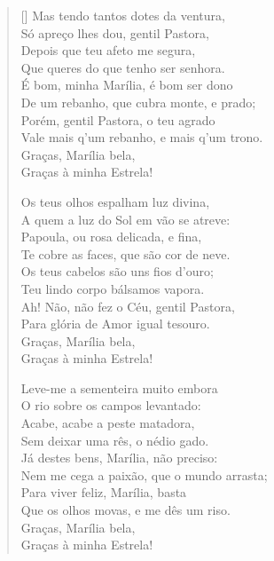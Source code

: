 \documentclass[12pt]{book}
\begin{document}
\begin{verse}[\versewidth]
					Mas tendo tantos dotes da ventura, \\
					Só apreço lhes dou, gentil Pastora, \\
					Depois que teu afeto me segura, \\
					Que queres do que tenho ser senhora. \\
					É bom, minha Marília, é bom ser dono \\
					De um rebanho, que cubra monte, e prado; \\
					Porém, gentil Pastora, o teu agrado \\
					Vale mais q’um rebanho, e mais q’um trono. \\
					\hspace{2em} Graças, Marília bela, \\
					\hspace{2em} Graças à minha Estrela!
					
					Os teus olhos espalham luz divina, \\
					A quem a luz do Sol em vão se atreve: \\
					Papoula, ou rosa delicada, e fina, \\
					Te cobre as faces, que são cor de neve. \\
					Os teus cabelos são uns fios d’ouro; \\
					Teu lindo corpo bálsamos vapora. \\
					Ah! Não, não fez o Céu, gentil Pastora, \\
					Para glória de Amor igual tesouro. \\
					\hspace{2em} Graças, Marília bela, \\
					\hspace{2em} Graças à minha Estrela!
					
					Leve-me a sementeira muito embora \\
					O rio sobre os campos levantado: \\
					Acabe, acabe a peste matadora, \\
					Sem deixar uma rês, o nédio gado. \\
					Já destes bens, Marília, não preciso: \\
					Nem me cega a paixão, que o mundo arrasta; \\
					Para viver feliz, Marília, basta \\
					Que os olhos movas, e me dês um riso. \\
					\hspace{2em} Graças, Marília bela, \\
					\hspace{2em} Graças à minha Estrela!
					

\end{verse}
\end{document}

